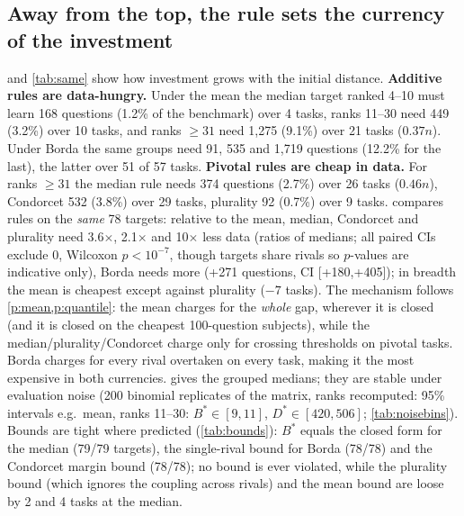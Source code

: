 \documentclass{article}
\theoremstyle{plain}
\theoremstyle{definition}
\theoremstyle{remark}
\newcommand{\Bst}{B^{\ast}}
\begin{document}
\subsection{Away from the top, the rule sets the currency of the investment}
 and \cref{tab:same} show how investment grows with the initial distance.
\textbf{Additive rules are data-hungry.} Under the mean the median target ranked 4--10 must learn 168 questions (1.2\% of the benchmark) over 4 tasks, ranks 11--30 need 449 (3.2\%) over 10 tasks, and ranks $\ge31$ need 1{,}275 (9.1\%) over 21 tasks ($0.37n$). Under Borda the same groups need 91, 535 and 1{,}719 questions (12.2\% for the last), the latter over 51 of 57 tasks.
\textbf{Pivotal rules are cheap in data.} For ranks $\ge31$ the median rule needs 374 questions (2.7\%) over 26 tasks ($0.46n$), Condorcet 532 (3.8\%) over 29 tasks, plurality 92 (0.7\%) over 9 tasks.
 compares rules on the \emph{same} 78 targets: relative to the mean, median, Condorcet and plurality need 3.6$\times$, 2.1$\times$ and 10$\times$ less data (ratios of medians; all paired CIs exclude 0, Wilcoxon $p<10^{-7}$, though targets share rivals so $p$-values are indicative only), Borda needs more (+271 questions, CI [+180,+405]); in breadth the mean is cheapest except against plurality ($-7$ tasks).
The mechanism follows \cref{p:mean,p:quantile}: the mean charges for the \emph{whole} gap, wherever it is closed (and it is closed on the cheapest 100-question subjects), while the median/plurality/Condorcet charge only for crossing thresholds on pivotal tasks. Borda charges for every rival overtaken on every task, making it the most expensive in both currencies.
 gives the grouped medians; they are stable under evaluation noise (200 binomial replicates of the matrix, ranks recomputed: 95\% intervals e.g.\ mean, ranks 11--30: $B^\ast\in[9,11]$, $D^\ast\in[420,506]$; \cref{tab:noisebins}). Bounds are tight where predicted (\cref{tab:bounds}): $\Bst$ equals the closed form for the median (79/79 targets), the single-rival bound for Borda (78/78) and the Condorcet margin bound (78/78); no bound is ever violated, while the plurality bound (which ignores the coupling across rivals) and the mean bound are loose by 2 and 4 tasks at the median.
\end{document}

